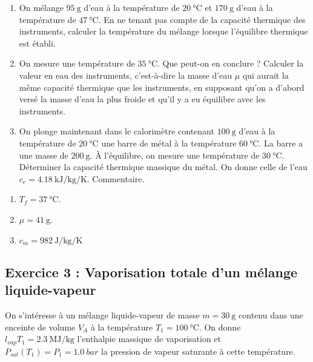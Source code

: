 \begin{enumerate}
	\item On mélange $\SI{95}{\gram}$ d'eau à la température de $\SI{20}{\degreeCelsius}$ et $\SI{170}{\gram}$ d'eau à la température de $\SI{47}{\degreeCelsius}$. En ne tenant pas compte de la capacité thermique des instruments, calculer la température du mélange lorsque l'équilibre thermique est établi.
	\item On mesure une température de $\SI{35}{\degreeCelsius}$. Que peut-on en conclure ? Calculer la valeur en eau des instruments, c'est-à-dire la masse d'eau $\mu$ qui aurait la même capacité thermique que les instruments, en supposant qu'on a d'abord versé la masse d'eau la plus froide et qu'il y a eu équilibre avec les instruments.
	\item On plonge maintenant dans le calorimètre contenant $\SI{100}{\gram}$ d'eau à la température de $\SI{20}{\degreeCelsius}$ une barre de métal à la température $\SI{60}{\degreeCelsius}$. La barre a une masse de $\SI{200}{\gram}$. À l'équilibre, on mesure une température de $\SI{30}{\degreeCelsius}$. Déterminer la capacité thermique massique du métal. On donne celle de l'eau $c_e = \SI{4.18}{\kilo\joule\per\kilogram\per\kelvin}$. Commentaire.
\end{enumerate}

\begin{enumerate}
	\item $T_f = \SI{37}{\degreeCelsius}$.
	\item $\mu = \SI{41}{\gram}$.
	\item $c_m = \SI{982}{\joule\per\kilogram\per\kelvin}$
\end{enumerate}

\subsection{Exercice 3 : Vaporisation totale d'un mélange liquide-vapeur}

On s'intéresse à un mélange liquide-vapeur de masse $m = \SI{30}{\gram}$ contenu dans une enceinte de volume $V_A$ à la température $T_1 = \SI{100}{\degreeCelsius}$. On donne $l_{vap}{T_1} = \SI{2.3}{\mega\joule\per\kilogram}$ l'enthalpie massique de vaporisation et $P_{sat}(T_1) = P_1 = \SI{1.0}{bar}$ la pression de vapeur saturante à cette température.

